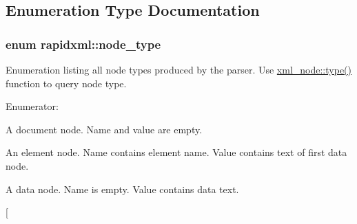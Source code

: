 \subsection{Enumeration Type Documentation}
\hypertarget{namespacerapidxml_abb456db38f7efb746c4330eed6072a7c}{
\subsubsection[{node\_\-type}]{\setlength{\rightskip}{0pt plus 5cm}enum {\bf rapidxml::node\_\-type}}}
\label{d7/d8a/namespacerapidxml_abb456db38f7efb746c4330eed6072a7c}
Enumeration listing all node types produced by the parser. Use \hyperlink{classrapidxml_1_1xml__node_a2c6a4315b98bcfa2e04fed3fa1b22c36}{xml\_\-node::type()} function to query node type. \begin{Desc}
\item[Enumerator: ]\par
\begin{description}
\item[{\em 
\hypertarget{namespacerapidxml_abb456db38f7efb746c4330eed6072a7ca4023b6a1c7059fd8fbec2112d5c35424}{
node\_\-document}
\label{d7/d8a/namespacerapidxml_abb456db38f7efb746c4330eed6072a7ca4023b6a1c7059fd8fbec2112d5c35424}
}]A document node. Name and value are empty. \item[{\em 
\hypertarget{namespacerapidxml_abb456db38f7efb746c4330eed6072a7ca89cbeb4d28046326e4ee953d3c4047ff}{
node\_\-element}
\label{d7/d8a/namespacerapidxml_abb456db38f7efb746c4330eed6072a7ca89cbeb4d28046326e4ee953d3c4047ff}
}]An element node. Name contains element name. Value contains text of first data node. \item[{\em 
\hypertarget{namespacerapidxml_abb456db38f7efb746c4330eed6072a7ca9d669d8e1f4ba9c7eeada4c14a11ad1d}{
node\_\-data}
\label{d7/d8a/namespacerapidxml_abb456db38f7efb746c4330eed6072a7ca9d669d8e1f4ba9c7eeada4c14a11ad1d}
}]A data node. Name is empty. Value contains data text. \item[{\em 
}
\end{description}
\end{Desc}
